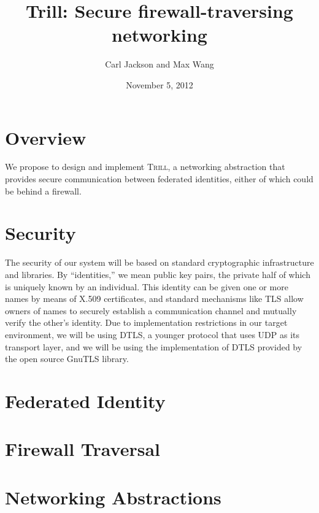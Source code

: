 \documentclass[12pt]{article}
\title{Trill: Secure firewall-traversing networking}
\author{Carl Jackson and Max Wang}
\date{November 5, 2012}
\newcommand{\trill}{\textsc{Trill}\xspace}
\begin{document}
\maketitle

\section*{Overview}
We propose to design and implement \trill, a networking abstraction that
provides secure communication between federated identities, either of which
could be behind a firewall.

\section*{Security}
The security of our system will be based on standard cryptographic
infrastructure and libraries. By ``identities,'' we mean public key pairs, the
private half of which is uniquely known by an individual. This identity can be
given one or more names by means of X.509 certificates, and standard mechanisms
like TLS allow owners of names to securely establish a communication channel and
mutually verify the other's identity. Due to implementation restrictions in our
target environment, we will be using DTLS, a younger protocol that uses UDP as
its transport layer, and we will be using the implementation of DTLS provided by
the open source GnuTLS library.

\section*{Federated Identity}

\section*{Firewall Traversal}

\section*{Networking Abstractions}
\end{document}
